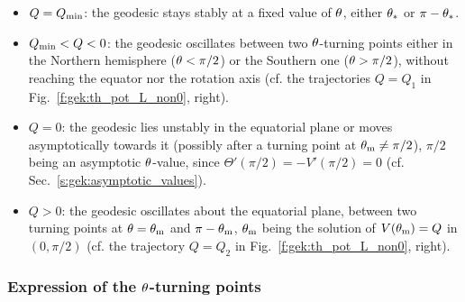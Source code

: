 \begin{itemize}
\begin{itemize}
\item $Q = Q_{\rm min}$: the geodesic stays stably at a fixed value of $\theta$,
either $\theta_*$ or $\pi - \theta_*$.
\item $Q_{\rm min} < Q < 0$: the geodesic oscillates between two $\theta$-turning
points either in the Northern
hemisphere ($\theta < \pi/2$) or the Southern one ($\theta > \pi/2$), without reaching
the equator nor the rotation axis (cf. the trajectories $Q=Q_1$ in Fig.~\ref{f:gek:th_pot_L_non0}, right).
\item $Q=0$: the geodesic lies unstably in the equatorial plane or
moves asymptotically towards it (possibly after a turning point at $\theta_{\rm m}\neq\pi/2$), $\pi/2$ being an asymptotic $\theta$-value, since $\Theta'(\pi/2) = - V'(\pi/2)=0$
(cf. Sec.~\ref{s:gek:asymptotic_values}).
\item $Q>0$: the geodesic oscillates about the equatorial plane,
between two turning points at $\theta=\theta_{\rm m}$ and $\pi-\theta_{\rm m}$, $\theta_{\rm m}$ being the solution
of $V(\theta_{\rm m}) = Q$ in $(0,\pi/2)$ (cf. the trajectory $Q=Q_2$ in Fig.~\ref{f:gek:th_pot_L_non0}, right).
\end{itemize}
\end{itemize}

\subsubsection{Expression of the $\theta$-turning points}

